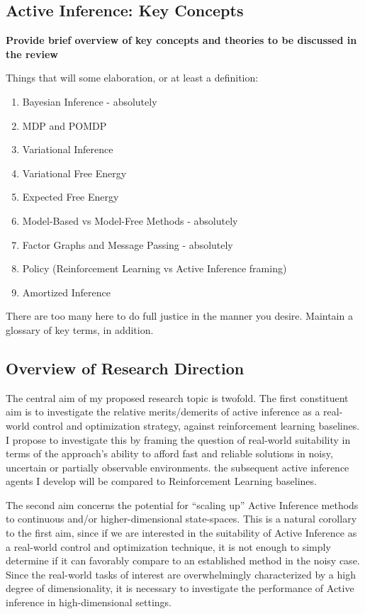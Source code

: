 \documentclass[onecolumn]{IEEEtran}
\begin{document}
\subsection{Active Inference: Key Concepts} 

\textbf{Provide brief overview of key concepts and theories to be discussed in the review}

Things that will some elaboration, or at least a definition:

\begin{enumerate}
	\item Bayesian Inference - absolutely
	\item MDP and POMDP
	\item Variational Inference
	\item Variational Free Energy
	\item Expected Free Energy
	\item Model-Based vs Model-Free Methods - absolutely
	\item Factor Graphs and Message Passing - absolutely
	\item Policy (Reinforcement Learning vs Active Inference framing)
	\item Amortized Inference
\end{enumerate}

There are too many here to do full justice in the manner you desire. Maintain a glossary of key terms, in addition.

\subsection{Overview of Research Direction}

The central aim of my proposed research topic is twofold. The first constituent aim is to investigate the relative merits/demerits of active inference as a real-world control and optimization strategy, against reinforcement learning baselines. I propose to investigate this by framing the question of real-world suitability in terms of the approach's ability to afford fast and reliable solutions in noisy, uncertain or partially observable environments. the subsequent active inference agents I develop will be compared to Reinforcement Learning baselines. 

The second aim concerns the potential for ``scaling up'' Active Inference methods to continuous and/or higher-dimensional state-spaces. This is a natural corollary to the first aim, since if we are interested in the suitability of Active Inference as a real-world control and optimization technique, it is not enough to simply determine if it can favorably compare to an established method in the noisy case. Since the real-world tasks of interest are overwhelmingly characterized by a high degree of dimensionality, it is necessary to investigate the performance of Active inference in high-dimensional settings.  
\end{document}

